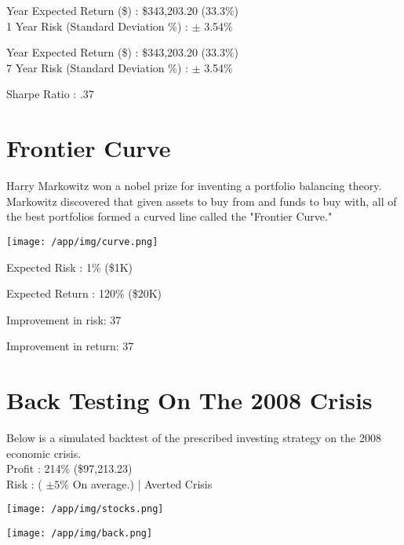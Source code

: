 \documentclass{article}
\begin{document}
 Year Expected Return (\$) : \$343,203.20 (33.3\%)\\
1 Year Risk (Standard Deviation \%) : $\pm$ 3.54\%

 Year Expected Return (\$) : \$343,203.20 (33.3\%)\\
7 Year Risk (Standard Deviation \%) : $\pm$ 3.54\%

\noindent
Sharpe Ratio : .37


\newpage



\section{Frontier Curve}

Harry Markowitz won a nobel prize for inventing a portfolio balancing theory. Markowitz discovered that given assets to buy from and funds to buy with, all of the  best portfolios formed a curved line called the "Frontier Curve."

\vspace{2cm}

\hspace*{-1cm}\texttt{[image: /app/img/curve.png]}\par

\vspace{1cm}


Expected Risk : 1\% (\$1K)


Expected Return : 120\% (\$20K)

Improvement in risk: 37%

Improvement in return: 37%


\newpage

\section{Back Testing On The 2008 Crisis}
Below is a simulated backtest of the prescribed investing strategy on the 2008 economic crisis. \\
Profit : 214\% (\$97,213.23)\\
Risk : ( $\pm 5\%$ On average.) | Averted Crisis

\vspace{.4cm}
\begin{center}
\hspace*{-1cm}\texttt{[image: /app/img/stocks.png]}\par

\vspace{.2cm}

\hspace*{-1cm}\texttt{[image: /app/img/back.png]}\par
\end{center}
\end{document}

